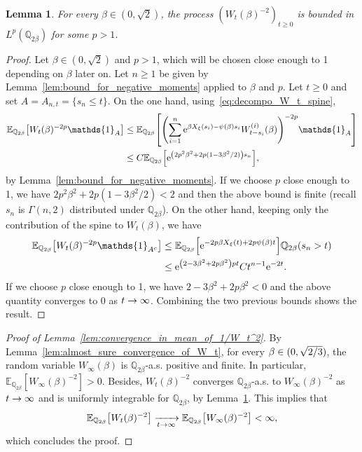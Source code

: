 \documentclass[10pt]{amsart}
\newtheorem{lemm}[theo]{Lemma}\newtheorem{prop}[theo]{Proposition}\newtheorem{coro}[theo]{Corollary}\newtheorem{conj}[theo]{Conjecture}
\theoremstyle{definition}\newtheorem{defi}[theo]{Definition}\newtheorem{rema}[theo]{Remark}\newtheorem{exam}[theo]{Example}\newtheorem{exem}[theo]{Example}\newtheorem{nota}[theo]{Notation}
\newcommand{\e}{\mathrm{e}}
\newcommand{\E}{\mathbb{E}}
\newcommand{\Q}{\mathbb{Q}}
\newcommand\1{\mathds{1}}
\let\originalleft\left
\let\originalright\right
\renewcommand{\left}{\mathopen{}\mathclose\bgroup\originalleft}
\renewcommand{\right}{\aftergroup\egroup\originalright}
\renewcommand*{\to}{\mathchoice{\longrightarrow}{\rightarrow}{\rightarrow}{\rightarrow}}
\begin{document}
\begin{lemm}\label{lem:bounded_in_Lp}
For every $\beta \in (0, \sqrt{2})$, the process $(W_t(\beta)^{-2})_{t \geq 0}$ is bounded in $L^p(\Q_{2\beta})$ for some $p > 1$.
\end{lemm}


\begin{proof}
Let $\beta \in (0, \sqrt{2})$ and $p > 1$, which will be chosen close enough to 1 depending on $\beta$ later on. Let $n \geq 1$ be given by Lemma~\ref{lem:bound_for_negative_moments} applied to $\beta$ and $p$. Let $t \geq 0$ and set $A = A_{n, t} = \{s_n \leq t\}$. On the one hand, using~\eqref{eq:decompo_W_t_spine},
\begin{align*}
\E_{\Q_{2\beta}} \left[W_t(\beta)^{-2p} \1_A \right] &\leq \E_{\Q_{2\beta}} \left[\left(\sum_{i = 1}^n \e^{\beta X_\xi(s_i) - \psi(\beta)s_i} W_{t - s_i}^{(i)}(\beta) \right)^{-2p} \1_A \right]\\
&\leq C \E_{\Q_{2\beta}} \left[\e^{\left(2p^2\beta^2 + 2p(1 - 3\beta^2/2)\right) s_n} \right],
\end{align*}
by Lemma~\ref{lem:bound_for_negative_moments}. If we choose $p$ close enough to 1, we have $2p^2\beta^2 + 2p(1 - 3\beta^2/2) < 2$ and then the above bound is finite (recall $s_n$ is $\Gamma(n,2)$ distributed under $\Q_{2\beta}$). On the other hand, keeping only the contribution of the spine to $W_t(\beta)$, we have
\begin{align*}
\E_{\Q_{2\beta}} \left[W_t(\beta)^{-2p} \1_{A^c} \right] &\leq \E_{\Q_{2\beta}} \left[\e^{-2p \beta X_\xi(t) + 2p \psi(\beta)t} \right] \Q_{2\beta}(s_n > t)\\
&\leq \e^{\left(2 - 3\beta^2 + 2p\beta^2\right)pt} C t^{n-1} \e^{-2t}.
\end{align*}
If we choose $p$ close enough to 1, we have $2 - 3\beta^2 + 2p\beta^2 < 0$ and the above quantity converges to $0$ as $t \to \infty$. Combining the two previous bounds shows the result.
\end{proof}

\begin{proof}[Proof of Lemma~\ref{lem:convergence_in_mean_of_1/W_t^2}]
By Lemma~\ref{lem:almost_sure_convergence_of_W_t}, for every $\beta \in (0, \sqrt{2\smash{/}3})$, the random variable $W_\infty(\beta)$ is $\Q_{2\beta}$-a.s. positive and finite. In particular, $\E_{\Q_{2\beta}}[W_\infty(\beta)^{-2}] > 0$. Besides, $W_t(\beta)^{-2}$ converges $\Q_{2\beta}$-a.s. to $W_\infty(\beta)^{-2}$ as $t \to \infty$ and is uniformly integrable for $\Q_{2\beta}$, by Lemma~\ref{lem:bounded_in_Lp}. This implies that
\begin{equation*}
\E_{\Q_{2\beta}}\left[W_t(\beta)^{-2}\right] \xrightarrow[t \to \infty]{} \E_{\Q_{2\beta}}\left[W_\infty(\beta)^{-2}\right] < \infty,
\end{equation*}
which concludes the proof.
\end{proof}
\end{document}
